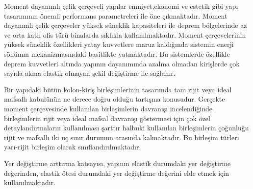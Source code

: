 	Moment dayanımlı çelik çerçeveli yapılar emniyet,ekonomi ve estetik
	gibi yapı tasarımının önemli performans parametreleri ile öne çıkmaktadır.
	Moment dayanımlı çelik çerçeveler yüksek süneklik kapasiteleri ile
	deprem bölgelerinde az ve orta katlı ofis türü binalarda sıklıkla
	kullanılmaktadır. Moment çerçevelerinin yüksek süneklik özellikleri
	yatay kuvvetlere maruz kaldığında sistemin enerji sönümm mekanizmasındaki
	basitlikte yatmaktadır. Bu sistemlerde özellikle deprem kuvvetleri
	altında yapının dayanımında azalma olmadan kirişlerde çok sayıda akma
	elastik olmayan şekil değiştirme ile sağlanır.
	
	Bir yapıdaki bütün kolon-kiriş birleşimlerinin tasarımda tam rijit
	veya ideal mafsallı kabulünün ne derece doğru olduğu tartışma konusudur.
	Gerçekte moment çerçevesinde kullanılan birleşimlerin davranışı incelendiğinde
	birleşimlerin rijit veya ideal mafsal davranışı göstermesi için çok
	özel detaylandırmaların kullanılması şarttır halbuki kullanılan birleşimlerin
	çoğunluğu rijit ve mafsallı iki uç sınır durumun arasında kalmaktadır.
	Bu birleşim türleri yarı-rijit birleşim olarak sınıflandırılmaktadır. 
	
	Yer değiştirme arttırma katsayısı, yapının elastik durumdaki yer değiştirme
	değerinden, elastik ötesi durumdaki yer değiştirme değerini elde etmek
	için kullanılmaktadır. 
